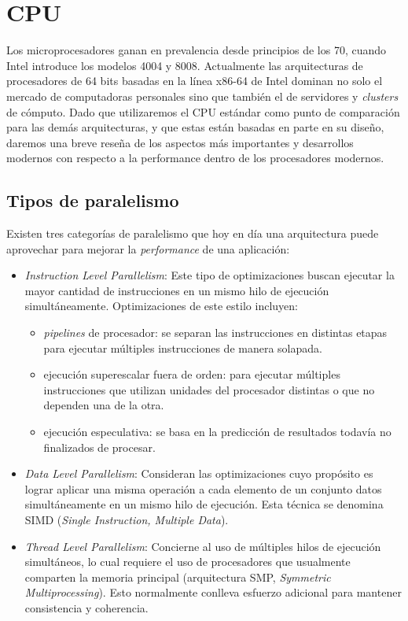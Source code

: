 \section{CPU}

Los microprocesadores ganan en prevalencia desde principios de los 70, cuando Intel introduce los modelos 4004 y 8008. 
Actualmente las arquitecturas de procesadores de 64 bits basadas en la l\'inea x86-64 de Intel dominan no solo el mercado de computadoras personales sino que tambi\'en el de servidores y \textit{clusters} de c\'omputo. 
Dado que utilizaremos el CPU est\'andar como punto de comparaci\'on para las dem\'as arquitecturas, y que estas est\'an basadas en parte en su dise\~no, daremos una breve rese\~na de los aspectos m\'as importantes y desarrollos modernos con respecto a la performance dentro de los procesadores modernos.

\subsection{Tipos de paralelismo}

Existen tres categor\'ias de paralelismo que hoy en d\'ia una arquitectura puede aprovechar para mejorar la \textit{performance} de una aplicaci\'on:
\begin{itemize}
    \item \textit{Instruction Level Parallelism}: Este tipo de optimizaciones buscan
    ejecutar la mayor cantidad de instrucciones en un mismo hilo de ejecuci\'on simult\'aneamente.
    Optimizaciones de este estilo incluyen:
    \begin{itemize}
      \item \textit{pipelines} de procesador: se separan las instrucciones en distintas etapas para ejecutar m\'ultiples instrucciones de manera solapada.
      \item ejecuci\'on superescalar fuera de orden: para ejecutar m\'ultiples instrucciones que utilizan unidades del procesador distintas o que no dependen una de la otra.
      \item ejecuci\'on especulativa: se basa en la predicci\'on de resultados todav\'ia no finalizados de procesar.
    \end{itemize}

    \item \textit{Data Level Parallelism}: Consideran las optimizaciones cuyo prop\'osito es lograr aplicar una misma operaci\'on a cada elemento de un conjunto datos simult\'aneamente
    en un mismo hilo de ejecuci\'on. Esta t\'ecnica se denomina SIMD (\textit{Single Instruction, Multiple Data}).

    \item \textit{Thread Level Parallelism}: Concierne al uso de m\'ultiples hilos de ejecuci\'on simult\'aneos, lo cual requiere el uso de procesadores que usualmente
    comparten la memoria principal (arquitectura SMP, \textit{Symmetric Multiprocessing}).
    Esto normalmente conlleva esfuerzo adicional para mantener consistencia y coherencia.
\end{itemize}

